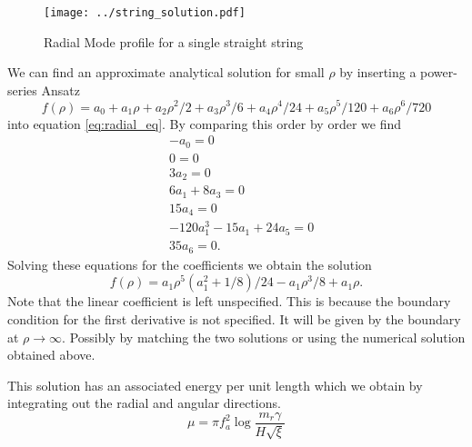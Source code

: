 \documentclass[a4paper]{article}
\begin{document}
\begin{figure}[H]
	\texttt{[image: ../string\_solution.pdf]}
	\caption{Radial Mode profile for a single straight string}
\end{figure}

We can find an approximate analytical solution for small $\rho$ by inserting a power-series Ansatz
\begin{equation}
	f(\rho) = 
	a_0 + a_1 \rho + a_2 \rho^2/2 + a_3 \rho^3/6 + a_4 \rho^4/24 + a_5 \rho^5/120 + a_6 \rho^6/720	
\end{equation}
into equation \eqref{eq:radial_eq}.
By comparing this order by order we find
\begin{align}
	&-a_0 = 0 \\
	&0 = 0 \\
	&3 a_2 = 0 \\
	&6 a_1 + 8 a_3 = 0\\
	&15a_4 = 0\\
	&-120 a_1^3 - 15a_1 + 24a_5 = 0\\
	&35 a_6 = 0.
\end{align}
Solving these equations for the coefficients we obtain the 
solution
\begin{equation}
	f(\rho) = a_1\rho^5(a_1^2 + 1/8)/24 - a_1\rho^3/8 + a_1\rho.
\end{equation}
Note that the linear coefficient is left unspecified.
This is because the boundary condition for the first derivative is not specified.
It will be given by the boundary at $\rho \to \infty$. Possibly by matching the two solutions or using the numerical solution obtained above.





This solution has an associated energy per unit length which we obtain by integrating out the radial and angular directions.
\begin{equation}
	\mu = \pi f_a^2 \log \frac{m_r \gamma}{H \sqrt{\xi}}
\end{equation}
\end{document}
